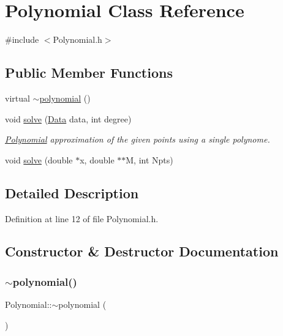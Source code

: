 \hypertarget{class_polynomial}{}\section{Polynomial Class Reference}
\label{class_polynomial}


{\ttfamily \#include $<$Polynomial.\+h$>$}

\subsection*{Public Member Functions}
\begin{DoxyCompactItemize}
\item 
virtual \mbox{\hyperlink{class_polynomial_a7e654cbc56334a4c36cf8851483d889e}{$\sim$polynomial}} ()
\item 
void \mbox{\hyperlink{class_polynomial_ab171b804b169ec3642cf0f86a6ee995b}{solve}} (\mbox{\hyperlink{struct_data}{Data}} data, int degree)
\begin{DoxyCompactList}\small\item\em \mbox{\hyperlink{class_polynomial}{Polynomial}} approximation of the given points using a single polynome. \end{DoxyCompactList}\item 
void \mbox{\hyperlink{class_polynomial_ac954ae1f64db7fab5b16ab60fc3f6709}{solve}} (double $\ast$x, double $\ast$$\ast$M, int Npts)
\end{DoxyCompactItemize}


\subsection{Detailed Description}


Definition at line 12 of file Polynomial.\+h.



\subsection{Constructor \& Destructor Documentation}
\mbox{\label{class_polynomial_a7e654cbc56334a4c36cf8851483d889e}} 
\subsubsection{\texorpdfstring{$\sim$polynomial()}{~polynomial()}}
{\footnotesize\ttfamily Polynomial\+::$\sim$polynomial (\begin{DoxyParamCaption}{ }\end{DoxyParamCaption})\hspace{0.3cm}{\ttfamily [virtual]}}



